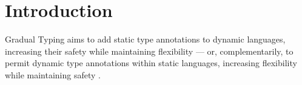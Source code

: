 \documentclass[sigplan,10pt,review,screen]{acmart}\settopmatter{printfolios=true}
\begin{document}
\begin{CCSXML}
\end{CCSXML}


\maketitle


\section{Introduction}


Gradual Typing aims to add static type annotations to dynamic languages, increasing
their safety while maintaining flexibility
\citep{GiladPluggable2004,Siek2006,XXXSiek2015}
--- or, complementarily,
to permit dynamic type annotations within static languages, increasing
flexibility while maintaining safety
\citep{AbadiTOPLAS1991}.
\end{document}
